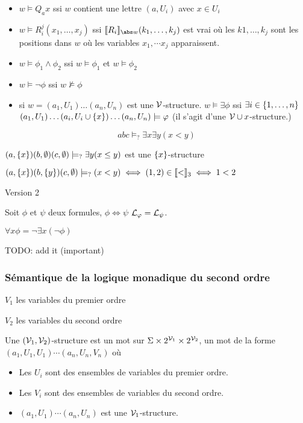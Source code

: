 \begin{itemize}
	\item $w \models Q_a x$ ssi $w$ contient une lettre $(a,U_i)$ avec $x \in U_i$
	\item $w \models R_i^j(x_1, \ldots, x_j)$ ssi $\interpret {R_i}_{\abs w}(k_1, \ldots, k_j)$ est vrai où les $k1, \ldots, k_j$ sont les positions dans $w$ où les variables
	      $x_1, \cdots x_j$ apparaissent.
	\item $w \models \phi_1 \land \phi_2$ ssi $w \models \phi_1$ et $w \models \phi_2$
	\item $w \models \lnot \phi$ ssi $w \nvDash \phi$
	\item si $w = (a_1, U_1) \ldots (a_n, U_n)$ est une $\mathcal{V}$-structure.
	      $w \models \exists \phi$ ssi $\exists i \in \left\{1, \ldots, n\right\}$
	      $(a_1, U_1) \ldots  (a_i, U_i \cup \left\{x\right\})  \ldots (a_n, U_n) \models \varphi$
	      (il s'agit d'une $\mathcal{V} \cup {x}$-structure.)
\end{itemize}

\begin{exemple}
	$$abc \models_? \exists x \exists y (x < y)$$

	$(a, \left\{x\right\})(b, \emptyset)(c, \emptyset) \models_? \exists y (x \leq y)$ est une $\left\{x\right\} $-structure

	$(a, \left\{x\right\})(b, \left\{y\right\})(c, \emptyset) \models_? (x < y) \iff (1,2) \in \llbracket < \rrbracket_3 \iff 1 < 2$

	Version 2

\end{exemple}


Soit $\phi$ et $\psi$ deux formules, $\phi \iff \psi$ \ssi $\mathcal{L}_{\varphi} = \mathcal{L}_{\psi}$.

\begin{abbreviation}
	$\forall x \phi = \neg \exists x (\neg \phi)$
\end{abbreviation}

\begin{exemple}
	TODO: add it (important)
\end{exemple}


\subsubsection{Sémantique de la logique monadique du second ordre}


$V_1$ les variables du premier ordre

$V_2$ les variables du second ordre


\begin{definition}
	Une $(\mathcal{V}_1,\mathcal{V}_2)$-structure est un mot sur $\Sigma \times 2^{\mathcal{V}_1} \times  2^{\mathcal{V}_2}$, \cad un mot de la forme
	$(a_1,U_1,U_1) \cdots (a_n,U_n,V_n)$ où
	\begin{itemize}
		\item Les $U_i$ sont des ensembles de variables du premier ordre.
		\item Les $V_i$ sont des ensembles de variables du second ordre.
		\item $(a_1,U_1) \cdots (a_n,U_n)$ est une $\mathcal{V}_1$-structure.
	\end{itemize}
\end{definition}

